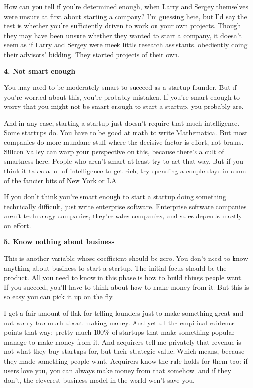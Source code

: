 How can you tell if you're determined enough, when Larry and Sergey
themselves were unsure at first about starting a company? I'm guessing
here, but I'd say the test is whether you're sufficiently driven to work
on your own projects. Though they may have been unsure whether they
wanted to start a company, it doesn't seem as if Larry and Sergey were
meek little research assistants, obediently doing their advisors'
bidding. They started projects of their own.

\textbf{4. Not smart enough}

You may need to be moderately smart to succeed as a startup founder. But
if you're worried about this, you're probably mistaken. If you're smart
enough to worry that you might not be smart enough to start a startup,
you probably are.

And in any case, starting a startup just doesn't require that much
intelligence. Some startups do. You have to be good at math to write
Mathematica. But most companies do more mundane stuff where the decisive
factor is effort, not brains. Silicon Valley can warp your perspective
on this, because there's a cult of smartness here. People who aren't
smart at least try to act that way. But if you think it takes a lot of
intelligence to get rich, try spending a couple days in some of the
fancier bits of New York or LA.

If you don't think you're smart enough to start a startup doing
something technically difficult, just write enterprise software.
Enterprise software companies aren't technology companies, they're sales
companies, and sales depends mostly on effort.

\textbf{5. Know nothing about business}

This is another variable whose coefficient should be zero. You don't
need to know anything about business to start a startup. The initial
focus should be the product. All you need to know in this phase is how
to build things people want. If you succeed, you'll have to think about
how to make money from it. But this is so easy you can pick it up on the
fly.

I get a fair amount of flak for telling founders just to make something
great and not worry too much about making money. And yet all the
empirical evidence points that way: pretty much 100\% of startups that
make something popular manage to make money from it. And acquirers tell
me privately that revenue is not what they buy startups for, but their
strategic value. Which means, because they made something people want.
Acquirers know the rule holds for them too: if users love you, you can
always make money from that somehow, and if they don't, the cleverest
business model in the world won't save you.

